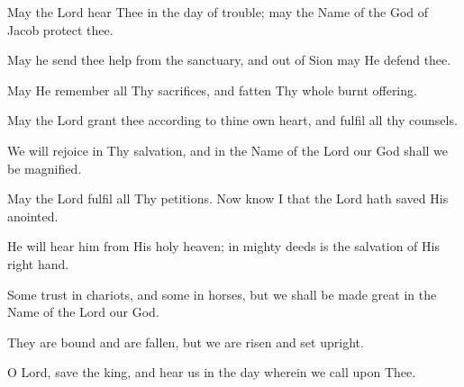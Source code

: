 May the Lord hear Thee in the day of trouble; may the Name of the God of Jacob protect thee.

May he send thee help from the sanctuary, and out of Sion may He defend thee.

May He remember all Thy sacrifices, and fatten Thy whole burnt offering.

May the Lord grant thee according to thine own heart, and fulfil all thy counsels.

We will rejoice in Thy salvation, and in the Name of the Lord our God shall we be magnified.

May the Lord fulfil all Thy petitions. Now know I that the Lord hath saved His anointed.

He will hear him from His holy heaven; in mighty deeds is the salvation of His right hand.

Some trust in chariots, and some in horses, but we shall be made great in the Name of the Lord our God.

They are bound and are fallen, but we are risen and set upright.

O Lord, save the king, and hear us in the day wherein we call upon Thee.
